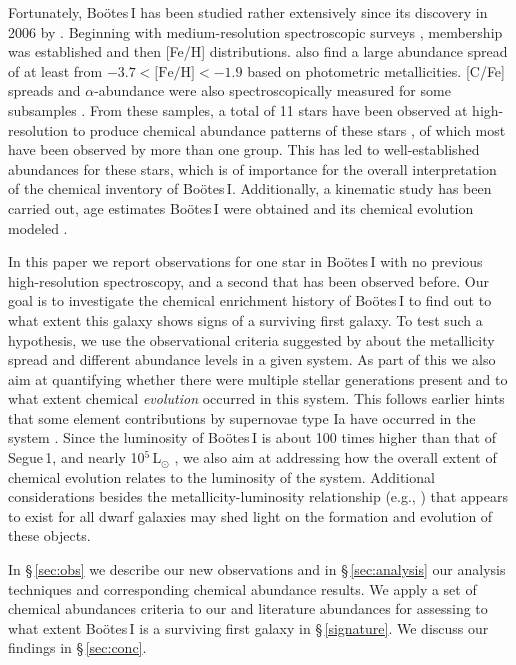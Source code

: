 \documentclass[]{emulateapj}
\begin{document}
Fortunately, Bo\"otes\,I has been studied rather extensively since its
discovery in 2006 by \citet{belokurov06}. Beginning with
medium-resolution spectroscopic surveys \citep{munoz06,norris_boo,
  norris10_booseg}, membership was established and then [Fe/H]
distributions. \citet{hughes08,hughes14} also find a large abundance
spread of at least from $-3.7 < \mbox{[Fe/H]} < -1.9$ based on
photometric metallicities. [C/Fe] spreads and $\alpha$-abundance were
also spectroscopically measured for some subsamples
\citep{lai11}. From these samples, a total of 11 stars have been
observed at high-resolution to produce chemical abundance patterns of
these stars \citep{feltzing09, norris10, gilmore13, ishigaki14}, of
which most have been observed by more than one group. This has led to
well-established abundances for these stars, which is of importance
for the overall interpretation of the chemical inventory of
Bo\"otes\,I. Additionally, a kinematic study \citet{koposov11} has
been carried out, age estimates Bo\"otes\,I were obtained
\citep{okamoto12,hughes14,brown14b} and its chemical evolution modeled
\citep{romano15}.

In this paper we report observations for one star in Bo\"otes\,I with
no previous high-resolution spectroscopy, and a second that has been
observed before. Our goal is to investigate the chemical enrichment
history of Bo\"otes\,I to find out to what extent this galaxy
  shows signs of a surviving first galaxy. To test such a hypothesis,
  we use the observational criteria suggested by \citet{frebel12}
  about the metallicity spread and different abundance levels in a
  given system. As part of this we also aim at quantifying whether
there were multiple stellar generations present and to what extent
chemical \textit{evolution} occurred in this system. This
  follows earlier hints that some element contributions by supernovae
  type Ia have occurred in the system \citep{gilmore13}. Since the
luminosity of Bo\"otes\,I is about 100 times higher than that of
Segue\,1, and nearly 10$^5$\,L$_{\odot}$ \citep{munoz06}, we also aim
at addressing how the overall extent of chemical evolution relates to
the luminosity of the system. Additional considerations besides the
metallicity-luminosity relationship (e.g., \citealt{kirby08}) that
appears to exist for all dwarf galaxies may shed light on the
formation and evolution of these objects.

In \S\,\ref{sec:obs} we describe our new observations and in
\S\,\ref{sec:analysis} our analysis techniques and corresponding
chemical abundance results. We apply a set of chemical abundances
criteria to our and literature abundances for assessing to what extent
Bo\"otes\,I is a surviving first galaxy in \S\,\ref{signature}. We
discuss our findings in \S\,\ref{sec:conc}. 
\end{document}
